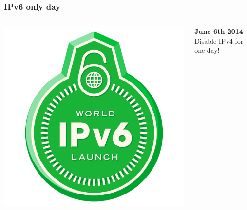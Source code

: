 \documentclass[14pt]{beamer}
\begin{document}
  \begin{frame}
    \frametitle{IPv6 only day}
    \begin{columns}
      \begin{column}{5cm}
        \includegraphics[scale=.3]{pictures/World_IPv6_launch_badge_512.png}
      \end{column}
      \begin{column}{6cm}
        \textbf{June 6th 2014}\\

        Disable IPv4 for one day!
      \end{column}
    \end{columns}
  \end{frame}
\end{document}
